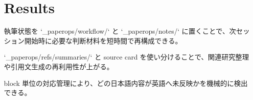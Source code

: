 \section{Results}

執筆状態を `_paperops/workflow/` と `_paperops/notes/` に置くことで、次セッション開始時に必要な判断材料を短時間で再構成できる。

`_paperops/refs/summaries/` と source card を使い分けることで、関連研究整理や引用文生成の再利用性が上がる。

block 単位の対応管理により、どの日本語内容が英語へ未反映かを機械的に検出できる。
